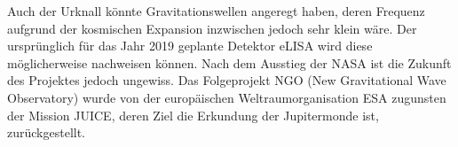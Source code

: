 Auch der Urknall könnte Gravitationswellen angeregt haben, deren Frequenz aufgrund der kosmischen Expansion inzwischen jedoch sehr klein wäre. Der ursprünglich für das Jahr 2019 geplante Detektor eLISA wird diese möglicherweise nachweisen können. Nach dem Ausstieg der NASA ist die Zukunft des Projektes jedoch ungewiss. Das Folgeprojekt NGO (New Gravitational Wave Observatory) wurde von der europäischen Weltraumorganisation ESA zugunsten der Mission JUICE, deren Ziel die Erkundung der Jupitermonde ist, zurückgestellt.